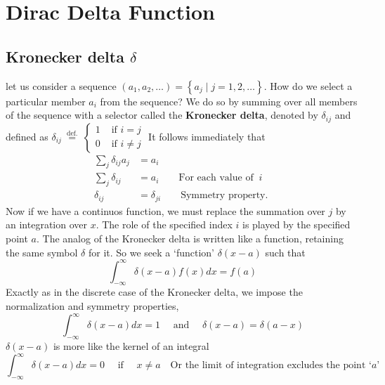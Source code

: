 \section{Dirac Delta Function}
\subsection{Kronecker delta $\delta$}
let us consider a sequence $\left(a_{1}, a_{2}, \ldots\right)=\left\{a_{j} \mid j=1,2, \ldots\right\} .$ How do we select a particular member $a_{i}$ from the sequence? We do so by summing over all members of the sequence with a selector called the \textbf{Kronecker delta}, denoted by $\delta_{i j}$ and defined as
$\delta_{i j} \stackrel{\text { def. }}{=}\left\{\begin{array}{ll}1 & \text { if } i=j \\ 0 & \text { if } i \neq j\end{array}\right.$
It follows immediately that
\begin{align*}
\sum_{j} \delta_{i j} a_{j}&=a_{i}\\
\sum_{j} \delta_{i j}&=a_{i}\qquad \text{For each value of } \ i\\
\delta_{i j}&=\delta_{j i} \qquad \text{Symmetry property. }
\end{align*}
Now if  we have a continuos function, we must replace the summation over  $j$ by an integration over $x$. The role of the specified index $i$ is played by the specified point $a$. The analog of the Kronecker delta is written like a function, retaining the same symbol $\delta$ for it. So we seek a `function' $\delta\left(x-a\right)$ such that
\begin{equation}
\int_{-\infty}^{\infty}  \delta\left(x-a\right) f(x) d x=f\left(a\right)
\end{equation}
Exactly as in the discrete case of the Kronecker delta, we impose the normalization and symmetry properties,
\begin{equation}
\int_{-\infty}^{\infty} \delta\left(x-a\right) d x=1 \quad \text { and } \quad \delta\left(x-a\right)=\delta\left(a-x\right)
\end{equation}
 $\delta\left(x-a\right)$ is more like the kernel of an integral
 \begin{equation}
 \int_{-\infty}^{\infty} \delta\left(x-a\right) d x=0 \quad \text { if } \quad x \neq a \quad \text{Or the limit of integration excludes the point `$a$'} 
 \end{equation}
